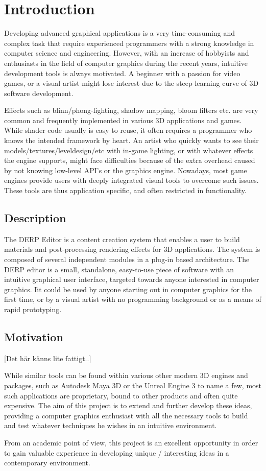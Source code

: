 \chapter{Introduction}

Developing advanced graphical applications is a very time-consuming and complex task that require experienced programmers with a strong knowledge in computer science and engineering. However, with an increase of hobbyists and enthusiasts in the field of computer graphics during the recent years, intuitive development tools is always motivated. A beginner with a passion for video games, or a visual artist might lose interest due to the steep learning curve of 3D software development.

Effects such as blinn/phong-lighting, shadow mapping, bloom filters etc. are very common and frequently implemented in various 3D applications and games. While shader code usually is easy to reuse, it often requires a programmer who knows the intended framework by heart. An artist who quickly wants to see their models/textures/leveldesign/etc with in-game lighting, or with whatever effects the engine supports, might face difficulties because of the extra overhead caused by not knowing low-level API's or the graphics engine. Nowadays, most game engines provide users with deeply integrated visual tools to overcome such issues. These tools are thus application specific, and often restricted in functionality. 
 
 \section{Description}

The DERP Editor is a content creation system that enables a user to build materials and post-processing rendering effects for 3D applications. The system is composed of several independent modules in a plug-in based architecture. The DERP editor is a small, standalone, easy-to-use piece of software with an intuitive graphical user interface, targeted towards anyone interested in computer graphics. Iit could be used by anyone starting out in computer graphics for the first time, or by a visual artist with no programming background or as a means of rapid prototyping. 

\section{Motivation}
[Det här känns lite fattigt..]

While similar tools can be found within various other modern 3D engines and packages, such as Autodesk Maya 3D or the Unreal Engine 3 to name a few, most such applications are proprietary, bound to other products and often quite expensive. The aim of this project is to extend and further develop these ideas, providing a computer graphics enthusiast with all the necessary tools to build and test whatever techniques he wishes in an intuitive environment. 
 
From an academic point of view, this project is an excellent opportunity in order to gain valuable experience in developing unique / interesting ideas in a contemporary environment. 
 